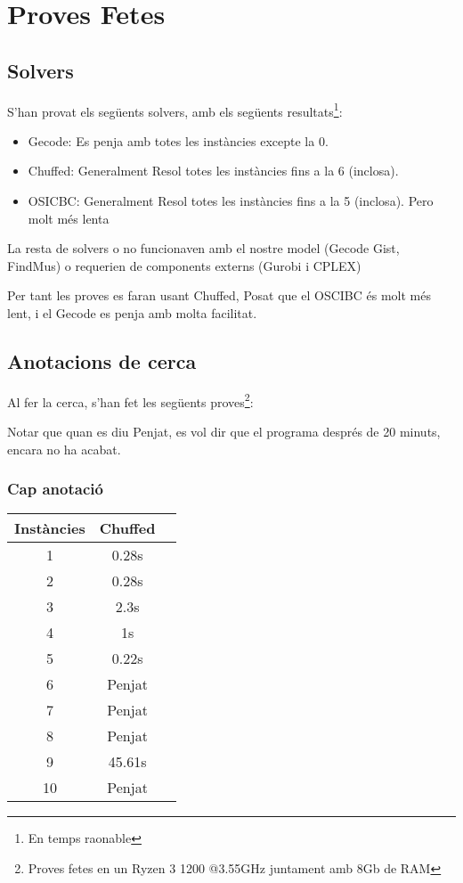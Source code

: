 \documentclass[11pt,a4paper,twoside]{report}
\begin{document}
\section{Proves Fetes}

\subsection{Solvers}

S'han provat els següents solvers, amb els següents resultats\footnote{En temps raonable}:

\begin{itemize}
    \item Gecode: Es penja amb totes les instàncies excepte la 0.
    \item Chuffed: Generalment Resol totes les instàncies fins a la 6 (inclosa).
    \item OSICBC: Generalment Resol totes les instàncies fins a la 5 (inclosa). Pero molt més lenta
\end{itemize}

La resta de solvers o no funcionaven amb el nostre model (Gecode Gist, FindMus) o requerien de components externs (Gurobi i CPLEX)

Per tant les proves es faran usant Chuffed, Posat que el OSCIBC és molt més lent, i el Gecode es penja amb molta facilitat. 

\subsection{Anotacions de cerca}

Al fer la cerca, s'han fet les següents proves\footnote{Proves fetes en un Ryzen 3 1200 @3.55GHz juntament amb 8Gb de RAM}:

Notar que quan es diu Penjat, es vol dir que el programa després de 20 minuts, encara no ha acabat. 


\subsubsection{Cap anotació}

\begin{tabular}{|c|c|c|}
    \hline
    Instàncies & Chuffed \\
    \hline
    1 &  0.28s \\
    2 &  0.28s \\
    3 &  2.3s \\
    4 &  1s \\
    5 &  0.22s \\
    6 &  Penjat \\
    7 &  Penjat \\
    8 &  Penjat \\
    9 &  45.61s \\
    10 & Penjat  \\

    \hline
\end{tabular}
\end{document}
